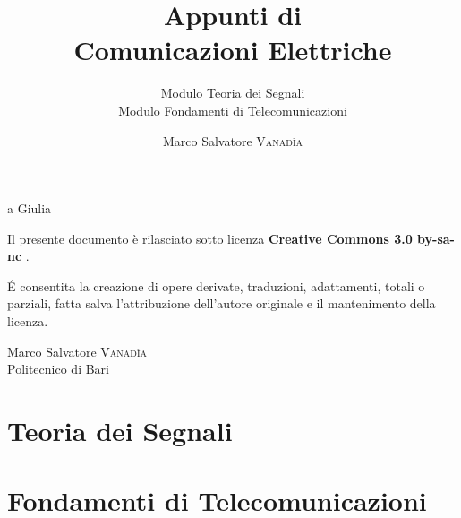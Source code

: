 \documentclass[10pt,a4paper,onecolumn,titlepage,twoside,openright,final]{book}
\title{Appunti di \\ Comunicazioni Elettriche}
\subtitle{Modulo Teoria dei Segnali\\Modulo Fondamenti di Telecomunicazioni}
\author{Marco Salvatore \textsc{Vanad\`{i}a}}
\begin{document}
\frontmatter
\maketitle
\newpage

\null{} 
\begin{flushright}a Giulia\end{flushright}
\null
\vfill
Il presente documento è rilasciato sotto licenza \ccLogo \textbf{Creative Commons 3.0 by-sa-nc} \ccbyncsa. 

\'{E} consentita la creazione di opere derivate, traduzioni, adattamenti, totali o parziali, fatta salva l'attribuzione dell'autore originale e il mantenimento della licenza. 

Marco Salvatore \textsc{Vanadìa}\\Politecnico di Bari
\cleardoublepage\clearpage{\pagestyle{empty}\cleardoublepage}

\tableofcontents

\mainmatter
\part{Teoria dei Segnali}

\part{Fondamenti di Telecomunicazioni}








{}

\printindex
{}
\listoffigures
%
\end{document}
